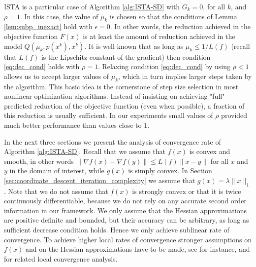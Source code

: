 \documentclass[11pt]{article}
\numberwithin{equation}{section}
\begin{document}
 ISTA  \cite{Beck2009} is a particular case of Algorithm \ref{alg:ISTA-SD} with $G_k=0$, for all $k$, and $\rho=1$. 
In this case, the value of  $\mu_k$ is chosen so that the conditions of Lemma \ref{lem:subp_inexact} hold with $\epsilon=0$. In other words, the reduction achieved in the objective function $F(x)$ is at least the amount of reduction achieved in the model 
$ Q(\mu_k,p(x^k),x^k)$. It is well known that as long as $\mu_k\leq 1/L(f)$ (recall that $L(f)$ is the Lipschitz constant of the gradient) then  condition \eqref{eq:dec_cond}
 holds with $\rho=1$.  Relaxing condition \eqref{eq:dec_cond} by using $\rho<1$ allows us to accept larger values of $\mu_k$, which in turn implies larger steps taken by the algorithm.   This basic idea is the cornerstone of step size selection in most nonlinear optimization algorithms. Instead of insisting on achieving "full" predicted reduction of the objective function (even when possible), a fraction of this reduction is usually sufficient. In our experiments small values of $\rho$ provided much better performance than values close to $1$. 


In the next three sections we present the analysis of convergence rate of  Algorithm \ref{alg:ISTA-SD}. Recall that we assume that $f(x)$ is convex and smooth, in other words $\|\nabla f(x)-\nabla f(y)\|\leq L(f)\|x-y\|$ for all $x$ and $y$ in the domain of interest, while $g(x)$ is simply convex. In Section \ref{sec:coordinate_descent_iteration_complexity} we assume that $g(x)=\lambda \|x\|_1$. Note that we do not assume that $f(x)$ is strongly convex or that it is twice continuously differentiable, because we do not rely on any accurate second order information in our framework. We only assume that the Hessian approximations are positive definite and bounded, but their accuracy can be arbitrary, as long as sufficient decrease condition holds. Hence we only achieve sublinear rate of convergence. To achieve higher local rates of convergence stronger assumptions on $f(x)$ and on the Hessian approximations have to be made, see for instance, \cite{Byrdetal2013} and \cite{Saundersetal} for related local convergence analysis. 
\end{document}
